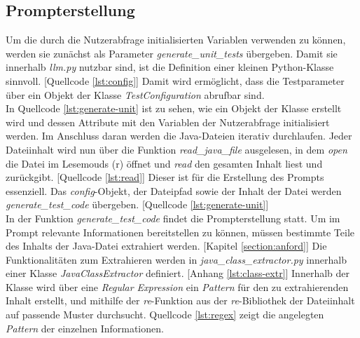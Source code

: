 \subsection{Prompterstellung}
Um die durch die Nutzerabfrage initialisierten Variablen verwenden zu können, werden sie zunächst als Parameter \textit{generate\_unit\_tests} übergeben. Damit sie innerhalb \textit{llm.py} nutzbar sind, ist die Definition einer kleinen Python-Klasse sinnvoll. [Quellcode \ref{lst:config}] Damit wird ermöglicht, dass die Testparameter über ein Objekt der Klasse \textit{TestConfiguration} abrufbar sind.\\
\vspace{-.3cm}
In Quellcode \ref{lst:generate-unit} ist zu sehen, wie ein Objekt der Klasse erstellt wird und dessen Attribute mit den Variablen der Nutzerabfrage initialisiert werden. Im Anschluss daran werden die Java-Dateien iterativ durchlaufen. Jeder Dateiinhalt wird nun über die Funktion \textit{read\_java\_file} ausgelesen, in dem \textit{open} die Datei im Lesemouds (r) öffnet und \textit{read} den gesamten Inhalt liest und zurückgibt. [Quellcode \ref{lst:read}] Dieser ist für die Erstellung des Prompts essenziell. Das \textit{config}-Objekt, der Dateipfad sowie der Inhalt der Datei werden \textit{generate\_test\_code} übergeben. [Quellcode \ref{lst:generate-unit}]\\
\vspace{1cm}
\vspace{-.3cm}
In der Funktion \textit{generate\_test\_code} findet die Prompterstellung statt. Um im Prompt relevante Informationen bereitstellen zu können, müssen bestimmte Teile des Inhalts der Java-Datei extrahiert werden. [Kapitel \ref{section:anford}] Die Funktionalitäten zum Extrahieren werden in \textit{java\_class\_extractor.py} innerhalb einer Klasse \textit{JavaClassExtractor} definiert. [Anhang \ref{lst:class-extr}] Innerhalb der Klasse wird über eine \textit{Regular Expression} ein \textit{Pattern} für den zu extrahierenden Inhalt erstellt, und mithilfe der \textit{re}-Funktion aus der \textit{re}-Bibliothek der Dateiinhalt auf passende Muster durchsucht. Quellcode \ref{lst:regex} zeigt die angelegten \textit{Pattern} der einzelnen Informationen.\\
